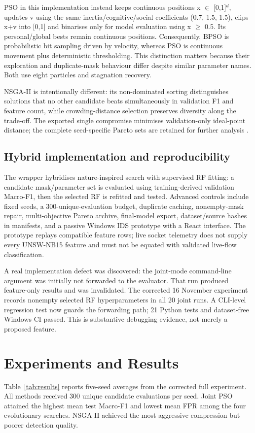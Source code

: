 \documentclass[10pt,a4paper,twocolumn]{extarticle}
\begin{document}
PSO in this implementation instead keeps continuous positions x $\in$ [0,1]$^d$, updates v using the same inertia/cognitive/social coefficients (0.7, 1.5, 1.5), clips x+v into [0,1] and binarises only for model evaluation using x $\geq$ 0.5. Its personal/global bests remain continuous positions. Consequently, BPSO is probabilistic bit sampling driven by velocity, whereas PSO is continuous movement plus deterministic thresholding. This distinction matters because their exploration and duplicate-mask behaviour differ despite similar parameter names. Both use eight particles and stagnation recovery.

NSGA-II is intentionally different: its non-dominated sorting distinguishes solutions that no other candidate beats simultaneously in validation F1 and feature count, while crowding-distance selection preserves diversity along the trade-off. The exported single compromise minimises validation-only ideal-point distance; the complete seed-specific Pareto sets are retained for further analysis \parencite{deb2002}.

\subsection{Hybrid implementation and reproducibility}
The wrapper hybridises nature-inspired search with supervised RF fitting: a candidate mask/parameter set is evaluated using training-derived validation Macro-F1, then the selected RF is refitted and tested. Advanced controls include fixed seeds, a 300-unique-evaluation budget, duplicate caching, nonempty-mask repair, multi-objective Pareto archive, final-model export, dataset/source hashes in manifests, and a passive Windows IDS prototype with a React interface. The prototype replays compatible feature rows; live socket telemetry does not supply every UNSW-NB15 feature and must not be equated with validated live-flow classification.

A real implementation defect was discovered: the joint-mode command-line argument was initially not forwarded to the evaluator. That run produced feature-only results and was invalidated. The corrected 16 November experiment records nonempty selected RF hyperparameters in all 20 joint runs. A CLI-level regression test now guards the forwarding path; 21 Python tests and dataset-free Windows CI passed. This is substantive debugging evidence, not merely a proposed feature.

\section{Experiments and Results}
Table~\ref{tab:results} reports five-seed averages from the corrected full experiment. All methods received 300 unique candidate evaluations per seed. Joint PSO attained the highest mean test Macro-F1 and lowest mean FPR among the four evolutionary searches. NSGA-II achieved the most aggressive compression but poorer detection quality.
\end{document}

